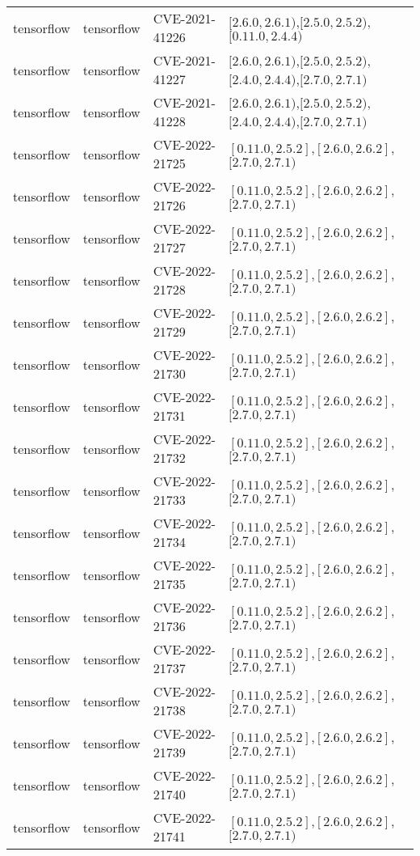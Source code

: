 \begin{tabular}{llll}
tensorflow & tensorflow & CVE-2021-41226 & $[2.6.0,2.6.1)$,$[2.5.0,2.5.2)$,$[0.11.0,2.4.4)$ \\
tensorflow & tensorflow & CVE-2021-41227 & $[2.6.0,2.6.1)$,$[2.5.0,2.5.2)$,$[2.4.0,2.4.4)$,$[2.7.0,2.7.1)$ \\
tensorflow & tensorflow & CVE-2021-41228 & $[2.6.0,2.6.1)$,$[2.5.0,2.5.2)$,$[2.4.0,2.4.4)$,$[2.7.0,2.7.1)$ \\
tensorflow & tensorflow & CVE-2022-21725 & $[0.11.0,2.5.2]$,$[2.6.0,2.6.2]$,$[2.7.0,2.7.1)$ \\
tensorflow & tensorflow & CVE-2022-21726 & $[0.11.0,2.5.2]$,$[2.6.0,2.6.2]$,$[2.7.0,2.7.1)$ \\
tensorflow & tensorflow & CVE-2022-21727 & $[0.11.0,2.5.2]$,$[2.6.0,2.6.2]$,$[2.7.0,2.7.1)$ \\
tensorflow & tensorflow & CVE-2022-21728 & $[0.11.0,2.5.2]$,$[2.6.0,2.6.2]$,$[2.7.0,2.7.1)$ \\
tensorflow & tensorflow & CVE-2022-21729 & $[0.11.0,2.5.2]$,$[2.6.0,2.6.2]$,$[2.7.0,2.7.1)$ \\
tensorflow & tensorflow & CVE-2022-21730 & $[0.11.0,2.5.2]$,$[2.6.0,2.6.2]$,$[2.7.0,2.7.1)$ \\
tensorflow & tensorflow & CVE-2022-21731 & $[0.11.0,2.5.2]$,$[2.6.0,2.6.2]$,$[2.7.0,2.7.1)$ \\
tensorflow & tensorflow & CVE-2022-21732 & $[0.11.0,2.5.2]$,$[2.6.0,2.6.2]$,$[2.7.0,2.7.1)$ \\
tensorflow & tensorflow & CVE-2022-21733 & $[0.11.0,2.5.2]$,$[2.6.0,2.6.2]$,$[2.7.0,2.7.1)$ \\
tensorflow & tensorflow & CVE-2022-21734 & $[0.11.0,2.5.2]$,$[2.6.0,2.6.2]$,$[2.7.0,2.7.1)$ \\
tensorflow & tensorflow & CVE-2022-21735 & $[0.11.0,2.5.2]$,$[2.6.0,2.6.2]$,$[2.7.0,2.7.1)$ \\
tensorflow & tensorflow & CVE-2022-21736 & $[0.11.0,2.5.2]$,$[2.6.0,2.6.2]$,$[2.7.0,2.7.1)$ \\
tensorflow & tensorflow & CVE-2022-21737 & $[0.11.0,2.5.2]$,$[2.6.0,2.6.2]$,$[2.7.0,2.7.1)$ \\
tensorflow & tensorflow & CVE-2022-21738 & $[0.11.0,2.5.2]$,$[2.6.0,2.6.2]$,$[2.7.0,2.7.1)$ \\
tensorflow & tensorflow & CVE-2022-21739 & $[0.11.0,2.5.2]$,$[2.6.0,2.6.2]$,$[2.7.0,2.7.1)$ \\
tensorflow & tensorflow & CVE-2022-21740 & $[0.11.0,2.5.2]$,$[2.6.0,2.6.2]$,$[2.7.0,2.7.1)$ \\
tensorflow & tensorflow & CVE-2022-21741 & $[0.11.0,2.5.2]$,$[2.6.0,2.6.2]$,$[2.7.0,2.7.1)$ \\

\end{tabular}
